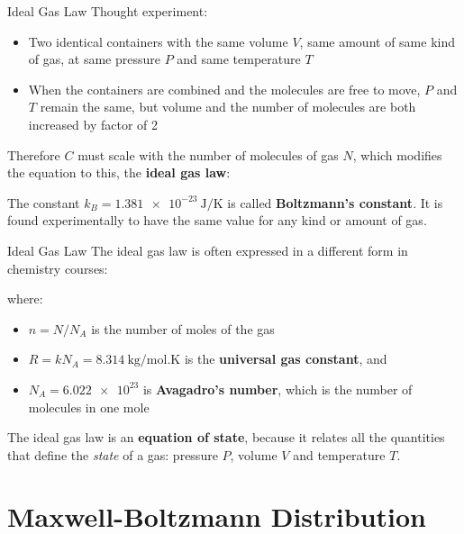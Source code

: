 \documentclass[12pt,aspectratio=169]{beamer}
\newcommand{\eq}[2]{
  \vspace{#1}{\Large
    \begin{displaymath}
      #2
    \end{displaymath}
  }
}
\begin{document}
\begin{frame}{Ideal Gas Law}
  Thought experiment:
  \begin{itemize}
  \item Two identical containers with the same volume $V$, same amount of same
    kind of gas, at same pressure $P$ and same temperature $T$
  \item When the containers are combined and the molecules are free to move,
    $P$ and $T$ remain the same, but volume and the number of molecules are
    both increased by factor of 2
  \end{itemize}
  Therefore $C$ must scale with the number of molecules of gas $N$, which
  modifies the equation to this, the \textbf{ideal gas law}:

  \eq{-.25in}{
    \boxed{PV=Nk_BT}
  }

  \vspace{-.15in}The constant $k_B=\SI{1.381e-23}{\joule\per\kelvin}$ is called
  \textbf{Boltzmann's constant}. It is found experimentally to have the same
  value for any kind or amount of gas.
\end{frame}



\begin{frame}{Ideal Gas Law}
  The ideal gas law is often expressed in a different form in chemistry
  courses:  

  \eq{-.25in}{
    \boxed{PV=nRT}
  }

  \vspace{-.2in}where:
  \begin{itemize}
  \item $n=N/N_A$ is the number of moles of the gas
  \item $R=kN_A=\SI{8.314}{\kilo\gram/\mol.\kelvin}$ is the
    \textbf{universal gas constant}, and
  \item $N_A=\num{6.022e23}$ is \textbf{Avagadro's number}, which is the number
    of molecules in one mole
  \end{itemize}

  \vspace{.1in}The ideal gas law is an \textbf{equation of state}, because it
  relates all the quantities that define the \emph{state} of a gas: pressure
  $P$, volume $V$ and temperature $T$.
\end{frame}



\section{Maxwell-Boltzmann Distribution}
\end{document}

